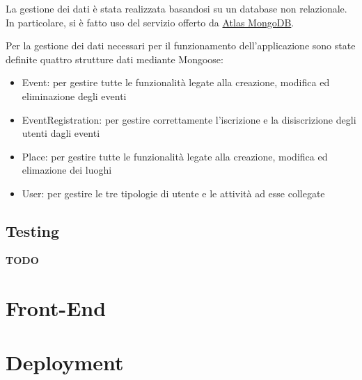 \documentclass[9pt]{extarticle}
\begin{document}
La gestione dei dati è stata realizzata basandosi su un database non
relazionale. In particolare, si è fatto uso del servizio offerto da
\href{https://www.mongodb.com/products/platform/atlas-database}{Atlas MongoDB}.

Per la gestione dei dati necessari per il funzionamento dell'applicazione sono state definite quattro strutture dati mediante Mongoose:
\begin{itemize}
	\item Event: per gestire tutte le funzionalità legate alla creazione, modifica ed eliminazione degli eventi
	\item EventRegistration: per gestire correttamente l'iscrizione e la disiscrizione degli utenti dagli eventi
	\item Place: per gestire tutte le funzionalità legate alla creazione, modifica ed elimazione dei luoghi
	\item User: per gestire le tre tipologie di utente e le attività ad esse collegate
\end{itemize}

\newpage
\subsection{Testing}

\textbf{TODO}

\section{Front-End}

\section{Deployment}

	
\end{document}
